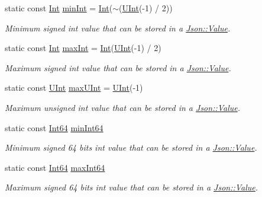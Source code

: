 \begin{DoxyCompactItemize}
static const \hyperlink{class_json_1_1_value_abdf7a7ff73eb130ffcab28504ffdb405}{Int} \hyperlink{class_json_1_1_value_a7df8a39e2502b8c92a6a41e3d752d2c8}{min\-Int} = \hyperlink{class_json_1_1_value_abdf7a7ff73eb130ffcab28504ffdb405}{Int}($\sim$(\hyperlink{class_json_1_1_value_a0933d59b45793ae4aade1757c322a98d}{U\-Int}(-\/1) / 2))
\begin{DoxyCompactList}\small\item\em Minimum signed int value that can be stored in a \hyperlink{class_json_1_1_value}{Json\-::\-Value}. \end{DoxyCompactList}\item 
static const \hyperlink{class_json_1_1_value_abdf7a7ff73eb130ffcab28504ffdb405}{Int} \hyperlink{class_json_1_1_value_a978c799a8af3114ef7dab6fd0a310a1b}{max\-Int} = \hyperlink{class_json_1_1_value_abdf7a7ff73eb130ffcab28504ffdb405}{Int}(\hyperlink{class_json_1_1_value_a0933d59b45793ae4aade1757c322a98d}{U\-Int}(-\/1) / 2)
\begin{DoxyCompactList}\small\item\em Maximum signed int value that can be stored in a \hyperlink{class_json_1_1_value}{Json\-::\-Value}. \end{DoxyCompactList}\item 
static const \hyperlink{class_json_1_1_value_a0933d59b45793ae4aade1757c322a98d}{U\-Int} \hyperlink{class_json_1_1_value_ac79e63ee68d3aa914bfd6988be669b87}{max\-U\-Int} = \hyperlink{class_json_1_1_value_a0933d59b45793ae4aade1757c322a98d}{U\-Int}(-\/1)
\begin{DoxyCompactList}\small\item\em Maximum unsigned int value that can be stored in a \hyperlink{class_json_1_1_value}{Json\-::\-Value}. \end{DoxyCompactList}\item 
static const \hyperlink{class_json_1_1_value_a1b86af9f85f0f1baa972c3319fa22695}{Int64} \hyperlink{class_json_1_1_value_a815ef899bc312c93bc426511acfe31a7}{min\-Int64}
\begin{DoxyCompactList}\small\item\em Minimum signed 64 bits int value that can be stored in a \hyperlink{class_json_1_1_value}{Json\-::\-Value}. \end{DoxyCompactList}\item 
static const \hyperlink{class_json_1_1_value_a1b86af9f85f0f1baa972c3319fa22695}{Int64} \hyperlink{class_json_1_1_value_a4492634870b8c5709ce967b384ac6006}{max\-Int64}
\begin{DoxyCompactList}\small\item\em Maximum signed 64 bits int value that can be stored in a \hyperlink{class_json_1_1_value}{Json\-::\-Value}. \end{DoxyCompactList}\item 

\end{DoxyCompactItemize}
